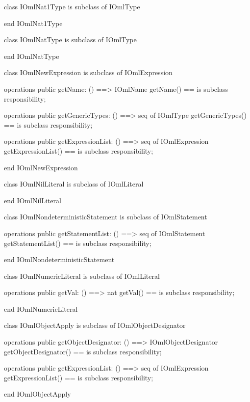 \begin{vdm_al}
class IOmlNat1Type
 is subclass of IOmlType

end IOmlNat1Type
\end{vdm_al}

\begin{vdm_al}
class IOmlNatType
 is subclass of IOmlType

end IOmlNatType
\end{vdm_al}

\begin{vdm_al}
class IOmlNewExpression
 is subclass of IOmlExpression

operations
  public getName: () ==> IOmlName
  getName() == is subclass responsibility;

operations
  public getGenericTypes: () ==> seq of IOmlType
  getGenericTypes() == is subclass responsibility;

operations
  public getExpressionList: () ==> seq of IOmlExpression
  getExpressionList() == is subclass responsibility;

end IOmlNewExpression
\end{vdm_al}

\begin{vdm_al}
class IOmlNilLiteral
 is subclass of IOmlLiteral

end IOmlNilLiteral
\end{vdm_al}

\begin{vdm_al}
class IOmlNondeterministicStatement
 is subclass of IOmlStatement

operations
  public getStatementList: () ==> seq of IOmlStatement
  getStatementList() == is subclass responsibility;

end IOmlNondeterministicStatement
\end{vdm_al}

\begin{vdm_al}
class IOmlNumericLiteral
 is subclass of IOmlLiteral

operations
  public getVal: () ==> nat
  getVal() == is subclass responsibility;

end IOmlNumericLiteral
\end{vdm_al}

\begin{vdm_al}
class IOmlObjectApply
 is subclass of IOmlObjectDesignator

operations
  public getObjectDesignator: () ==> IOmlObjectDesignator
  getObjectDesignator() == is subclass responsibility;

operations
  public getExpressionList: () ==> seq of IOmlExpression
  getExpressionList() == is subclass responsibility;

end IOmlObjectApply
\end{vdm_al}

